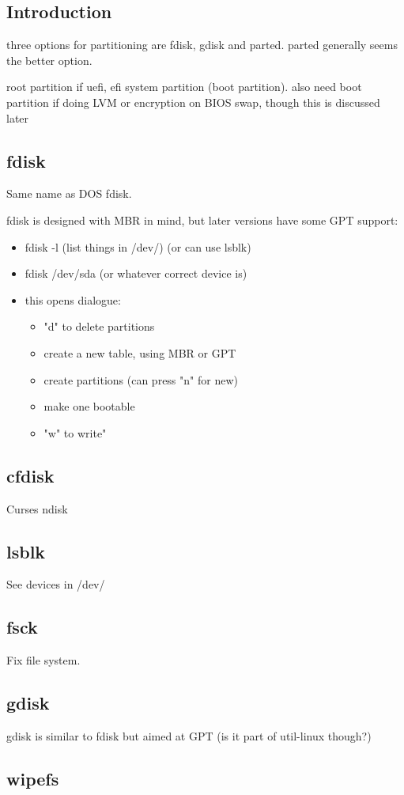 
\subsection{Introduction}

three options for partitioning are fdisk, gdisk and parted. parted generally seems the better option.


root partition
if uefi, efi system partition (boot partition). also need boot partition if doing LVM or encryption on BIOS
swap, though this is discussed later

\subsection{fdisk}

Same name as DOS fdisk.

fdisk is designed with MBR in mind, but later versions have some GPT support:

\begin{itemize}
  \item fdisk -l (list things in /dev/) (or can use lsblk)
  \item fdisk /dev/sda (or whatever correct device is)
  \item this opens dialogue:
  \begin{itemize}
    \item "d" to delete partitions
    \item create a new table, using MBR or GPT
    \item create partitions (can press "n" for new)
    \item make one bootable
    \item "w" to write"
  \end{itemize}
\end{itemize}

\subsection{cfdisk}

Curses ndisk

\subsection{lsblk}

See devices in /dev/
\subsection{fsck}

Fix file system.

\subsection{gdisk}

gdisk is similar to fdisk but aimed at GPT (is it part of util-linux though?)

\subsection{wipefs}

